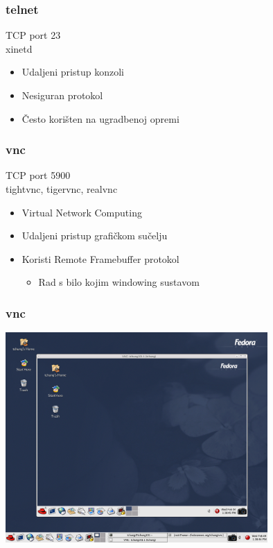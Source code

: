 \documentclass[t,table,usenames,dvipsnames]{beamer}
\begin{document}
\begin{frame}
	\frametitle{telnet}

	TCP port 23\\
	xinetd
	
	\begin{itemize}
		\item Udaljeni pristup konzoli
		\item Nesiguran protokol
		\item Često korišten na ugradbenoj opremi
	\end{itemize}
\end{frame}


\begin{frame}
	\frametitle{vnc}

	TCP port 5900\\
	tightvnc, tigervnc, realvnc

	\begin{itemize}
		\item Virtual Network Computing
		\item Udaljeni pristup grafičkom sučelju
		
		\item Koristi Remote Framebuffer protokol
		\begin{itemize}
			\item Rad s bilo kojim windowing sustavom
		\end{itemize}
	\end{itemize}
\end{frame}

\begin{frame}
	\frametitle{vnc}
	\centering
	\includegraphics[width=0.75\textwidth]{vnc-desktop.png}

\end{frame}
\end{document}
